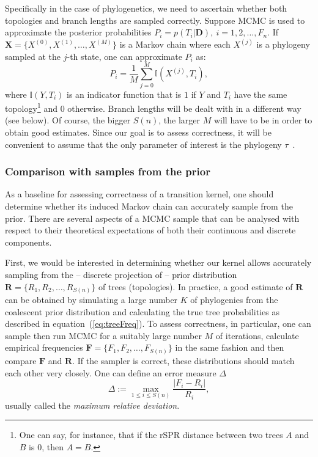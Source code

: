 Specifically in the case of phylogenetics, we need to ascertain whether both topologies and branch lengths are sampled correctly.
Suppose MCMC is used to approximate the posterior probabilities $P_i = p(T_i | \boldsymbol D),\: i = 1, 2, \ldots, F_n$.
If $\boldsymbol X = \{X^{(0)}, X^{(1)}, \ldots, X^{(M)}\}$ is a Markov chain where each $X^{(j)}$ is a phylogeny sampled at the $j$-th state, one can approximate $P_i$ as:
\begin{equation}
 \label{eq:treeFreq}
 P_i =  \frac{1}{M}\sum_{j=0} ^M \mathbb{I}(X^{(j)}, T_i),
\end{equation}
where $\mathbb{I}(Y, T_i)$ is an indicator function that is $1$ if $Y$ and $T_i$ have the same topology\footnote{One can say, for instance, that if the rSPR distance between two trees $A$ and $B$ is $0$, then $A = B$.} and $0$ otherwise.
Branch lengths will be dealt with in a different way (see below).
Of course, the bigger $S(n)$, the larger $M$ will have to be in order to obtain good estimates.
Since our goal is to assess correctness, it will be convenient to assume that the only parameter of interest is the phylogeny $\tau$~\citep{Lakner2008}.

\subsubsection{Comparison with samples from the prior}
As a baseline for assessing correctness of a transition kernel, one should determine whether its induced Markov chain can accurately sample from the prior.
There are several aspects of a MCMC sample that can be analysed with respect to their theoretical  expectations of both their continuous and discrete components.

First, we would be interested in determining whether our kernel allows accurately sampling from the -- discrete projection of -- prior distribution $\boldsymbol R = \{R_1, R_2, \ldots, R_{S(n)} \}$ of trees (topologies).
In practice, a good estimate of $\boldsymbol R$ can be obtained by simulating a large number $K$ of phylogenies from the coalescent prior distribution and calculating the true tree probabilities as described in equation~(\ref{eq:treeFreq}).
To assess correctness, in particular, one can sample then run MCMC for a suitably large number $M$ of iterations, calculate empirical frequencies $\boldsymbol F = \{F_1, F_2, \ldots, F_{S(n)} \}$ in the same fashion and then compare $\boldsymbol F$ and $\boldsymbol R$.
If the sampler is correct, these distributions should match each other very closely.
One can define an error measure $\Delta$
\[ \Delta := \max_{1 \leq i \leq S(n)} \frac{|F_i - R_i|}{R_i}, \]
usually called the \textit{maximum relative deviation}.  

